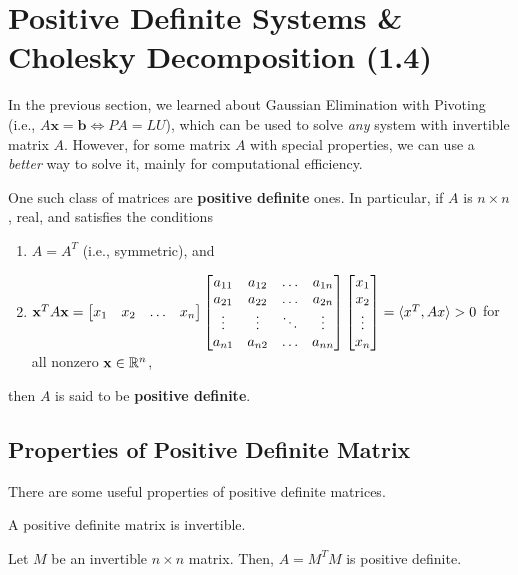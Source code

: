 \documentclass[letterpaper]{article}
\newcommand{\0}{\mathbf{0}}
\renewcommand{\b}{\mathbf{b}}
\newcommand{\x}{\mathbf{x}}
\begin{document}
\section{Positive Definite Systems \& Cholesky Decomposition (1.4)}
In the previous section, we learned about Gaussian Elimination with Pivoting (i.e., $A\x = \b \iff PA = LU$), which can be used to solve \emph{any} system with invertible matrix $A$. However, for some matrix $A$ with special properties, we can use a \emph{better} way to solve it, mainly for computational efficiency.  

\bigskip 

One such class of matrices are \textbf{positive definite} ones. In particular, if $A$ is $n \times n$, real, and satisfies the conditions 
\begin{enumerate}
    \item $A = A^T$ (i.e., symmetric), and 
    \item $\x^T A \x = \begin{bmatrix}
        x_1 & x_2 & \hdots & x_n
    \end{bmatrix} \begin{bmatrix}
        a_{11} & a_{12} & \hdots & a_{1n} \\ 
        a_{21} & a_{22} & \hdots & a_{2n} \\ 
        \vdots & \vdots & \ddots & \vdots \\ 
        a_{n1} & a_{n2} & \hdots & a_{nn}
    \end{bmatrix} \begin{bmatrix}
        x_1 \\ x_2 \\ \vdots \\ x_n
    \end{bmatrix} = \cyclic{x^T, Ax} > 0$ for all nonzero $\x \in \R^n$, 
\end{enumerate}
then $A$ is said to be \textbf{positive definite}. 

\subsection{Properties of Positive Definite Matrix}
There are some useful properties of positive definite matrices. 

\begin{lemma}{}{}
    A positive definite matrix is invertible. 
\end{lemma}

\begin{theorem}{}{}
    Let $M$ be an invertible $n \times n$ matrix. Then, $A = M^T M$ is positive definite.  
\end{theorem}
\end{document}

